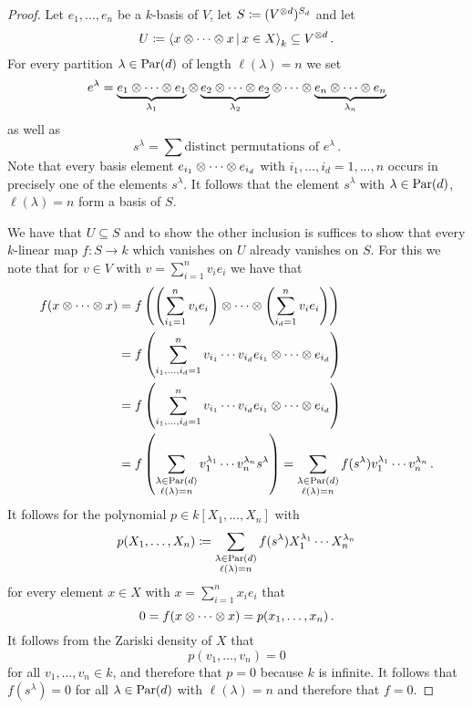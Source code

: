 \begin{proof}
  Let $e_1, \dotsc, e_n$ be a $k$-basis of $V$, let $S \coloneqq (V^{\mathbin{\otimes} d})^{S_d}$ and let
  \[
              U
    \defined \gen{ x \tensor \dotsb \tensor x \suchthat x \in X }_k
    \subseteq V^{\tensor d} \,.
  \]
  For every partition $\lambda \in \operatorname{Par}(d)$ of length $\ell(\lambda) = n$ we set
  \[
      e^\lambda
    =         \underbrace{e_1 \mathbin{\otimes} \dotsb \mathbin{\otimes} e_1}_{\lambda_1}
      \mathbin{\otimes} \underbrace{e_2 \mathbin{\otimes} \dotsb \mathbin{\otimes} e_2}_{\lambda_2}
      \mathbin{\otimes} \dotsb
      \mathbin{\otimes} \underbrace{e_n \mathbin{\otimes} \dotsb \mathbin{\otimes} e_n}_{\lambda_n}
  \]
  as well as
  \[
      s^\lambda
    = \sum \text{distinct permutations of $e^\lambda$} \,.
  \]
  Note that every basis element $e_{i_1} \mathbin{\otimes} \dotsb \mathbin{\otimes} e_{i_d}$ with $i_1, \dotsc, i_d = 1, \dotsc, n$ occurs in precisely one of the elements $s^\lambda$.
  It follows that the element $s^\lambda$ with $\lambda \in \operatorname{Par}(d)$, $\ell(\lambda) = n$ form a basis of $S$.
  
  We have that $U \subseteq S$ and to show the other inclusion is suffices to show that every $k$-linear map $f \colon S \to k$ which vanishes on $U$ already vanishes on $S$.
  For this we note that for $v \in V$ with $v = \sum_{i=1}^n v_i e_i$ we have that
  \begin{align*}
        f(x \mathbin{\otimes} \dotsb \mathbin{\otimes} x)
    &=  f\left(
          \left( \sum_{i_1=1}^n v_i e_i \right)
          \mathbin{\otimes} \dotsb \mathbin{\otimes}
          \left( \sum_{i_d=1}^n v_i e_i \right)
        \right)
    \\
    &=  f\left(
          \sum_{i_1, \dotsc, i_d = 1}^n
          v_{i_1} \dotsm v_{i_d}
          e_{i_1} \mathbin{\otimes} \dotsb \mathbin{\otimes} e_{i_d}
        \right)
    \\
    &=  f\left(
          \sum_{i_1, \dotsc, i_d = 1}^n
          v_{i_1} \dotsm v_{i_d}
          e_{i_1} \mathbin{\otimes} \dotsb \mathbin{\otimes} e_{i_d}
        \right)
    \\
    &=  f\left(
          \sum_{\substack{\lambda \in \operatorname{Par}(d) \\ \ell(\lambda) = n}}
          v_1^{\lambda_1} \dotsm v_n^{\lambda _n}
          s^\lambda
        \right)
     =  \sum_{\substack{\lambda \in \operatorname{Par}(d) \\ \ell(\lambda) = n}}
        f(s^\lambda)
        v_1^{\lambda_1} \dotsm v_n^{\lambda _n} \,.
  \end{align*}
  It follows for the polynomial $p \in k[X_1, \dotsc, X_n]$ with
  \[
              p(X_1, \dotsc, X_n)
    \coloneqq  \sum_{\substack{\lambda \in \operatorname{Par}(d) \\ \ell(\lambda) = n}}
              f( s^\lambda )
              X_1^{\lambda_1} \dotsm X_n^{\lambda_n}
  \]
  for every element $x \in X$ with $x = \sum_{i=1}^n x_i e_i$ that
  \[
      0
    = f(x \mathbin{\otimes} \dotsb \mathbin{\otimes} x)
    = p(x_1, \dotsc, x_n) \,.
  \]
  It follows from the Zariski density of $X$ that
  \[
      p(v_1, \dotsc, v_n)
    = 0
  \]
  for all $v_1, \dotsc, v_n \in k$, and therefore that $p = 0$ because $k$ is infinite.
  It follows that $f(s^\lambda) = 0$ for all $\lambda \in \operatorname{Par}(d)$ with $\ell(\lambda) = n$ and therefore that $f = 0$.
\end{proof}


